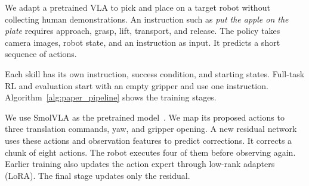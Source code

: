We adapt a pretrained VLA to pick and place on a target robot without collecting human demonstrations. An instruction such as \emph{put the apple on the plate} requires approach, grasp, lift, transport, and release. The policy takes camera images, robot state, and an instruction as input. It predicts a short sequence of actions.

Each skill has its own instruction, success condition, and starting states. Full-task RL and evaluation start with an empty gripper and use one instruction. Algorithm~\ref{alg:paper_pipeline} shows the training stages.

We use SmolVLA as the pretrained model~\cite{smolvla}. We map its proposed actions to three translation commands, yaw, and gripper opening. A new residual network uses these actions and observation features to predict corrections. It corrects a chunk of eight actions. The robot executes four of them before observing again. Earlier training also updates the action expert through low-rank adapters (LoRA). The final stage updates only the residual.
